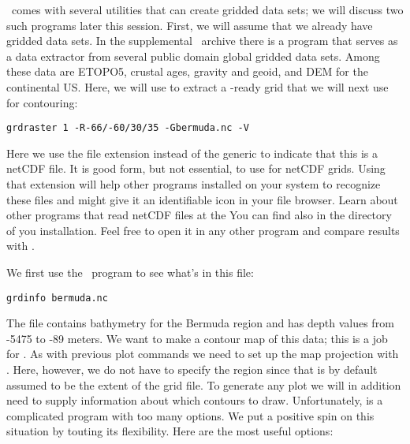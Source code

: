 \documentclass{report}
\begin{document}
\GMT\ comes with several utilities that can create gridded data
sets; we will discuss two such programs later this session.  First,
we will assume that we already have gridded data sets.  In the
supplemental \GMT\ archive there is a program that serves as a data
extractor from several public domain global gridded data sets.
Among these data are ETOPO5, crustal ages, gravity and geoid,
and DEM for the continental US.  Here, we will use 
to extract a \GMT-ready grid that we will next use for contouring:

{\small\begin{verbatim}
grdraster 1 -R-66/-60/30/35 -Gbermuda.nc -V
\end{verbatim}
}

Here we use the file extension  instead of the generic 
to indicate that this is a netCDF file. It is good form, but not essential,
to use  for netCDF grids. Using that extension will help
other programs installed on your system to recognize these files and might
give it an identifiable icon in your file browser.
Learn about other programs that read netCDF files at the
You can find  also in the  directory of you \GMT{}
installation.  Feel free to open it in any other program and compare results with \GMT.

We first use the \GMT\ program  to see what's in this file:

{\small\begin{verbatim} 
grdinfo bermuda.nc
\end{verbatim}
}

The file contains bathymetry for the Bermuda region and has depth
values from -5475 to -89 meters.  We want to make a contour map of
this data; this is a job for .  As with previous
plot commands we need to set up the map projection with .
Here, however, we do not have to specify the region since that is by
default assumed to be the extent of the grid file.
To generate any plot we will in addition need to supply information
about which contours to draw.  Unfortunately, 
is a complicated program with too many options.  We put a positive
spin on this situation by touting its flexibility.  Here are the most
useful options:
\end{document}
